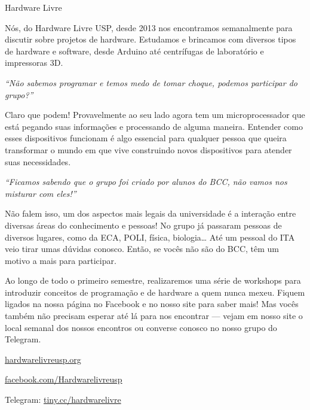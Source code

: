 \begin{subsecao}{Hardware Livre}


Nós, do Hardware Livre USP, desde 2013 nos encontramos semanalmente para
discutir sobre projetos de hardware. Estudamos e brincamos com diversos tipos de
hardware e software, desde Arduino até centrífugas de laboratório e impressoras
3D.

\textit{``Não sabemos programar e temos medo de tomar choque, podemos participar
do grupo?''}

Claro que podem! Provavelmente ao seu lado agora tem um microprocessador que
está pegando suas informações e processando de alguma maneira. Entender como
esses dispositivos funcionam é algo essencial para qualquer pessoa que queira
transformar o mundo em que vive construindo novos dispositivos para atender
suas necessidades.

\textit{``Ficamos sabendo que o grupo foi criado por alunos do BCC, não vamos
nos misturar com eles!''}

Não falem isso, um dos aspectos mais legais da universidade é a interação entre
diversas áreas do conhecimento e pessoas! No grupo já passaram pessoas de
diversos lugares, como da ECA, POLI, física, biologia… Até um pessoal do ITA
veio tirar umas dúvidas conosco. Então, se vocês não são do BCC, têm um motivo a
mais para participar.

Ao longo de todo o primeiro semestre, realizaremos uma série de workshops para
introduzir conceitos de programação e de hardware a quem nunca mexeu. Fiquem
ligados na nossa página no Facebook e no nosso site para saber mais! Mas vocês
também não precisam esperar até lá para nos encontrar — vejam em nosso site o
local semanal dos nossos encontros ou converse conosco no nosso grupo do
Telegram.

\begin{center}
  \Large
  \url{hardwarelivreusp.org}

  \url{facebook.com/Hardwarelivreusp}

  Telegram: \url{tiny.cc/hardwarelivre}
\end{center}

\end{subsecao}
